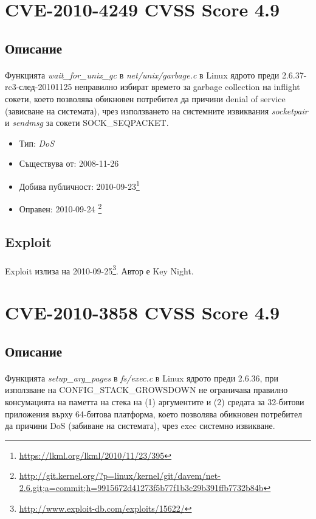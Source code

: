 \documentclass[a4paper,12pt,leqno]{article}
\begin{document}
\section{CVE-2010-4249 CVSS Score 4.9}
\subsection{Описание}
\paragraph{}
Функцията \textit{wait\_for\_unix\_gc} в \textit{net/unix/garbage.c} в Linux ядрото преди 2.6.37-rc3-след-20101125 неправилно избират времето за garbage collection на inflight сокети, което позволява обикновен потребител да причини denial of service (зависване на системата), чрез използването на системните извиквания \textit{socketpair} и \textit{sendmsg} за сокети SOCK\_SEQPACKET.

\begin{itemize}
    \item Тип: \textit{DoS}
    \item Съществува от: 2008-11-26
  	\item Добива публичност: 2010-09-23\footnote{\url{https://lkml.org/lkml/2010/11/23/395}}
    \item Оправен: 2010-09-24 \footnote{\url{http://git.kernel.org/?p=linux/kernel/git/davem/net-2.6.git;a=commit;h=9915672d41273f5b77f1b3c29b391ffb7732b84b}}
\end{itemize}

\subsection{Exploit}
\paragraph{}
Exploit излиза на 2010-09-25\footnote{\url{http://www.exploit-db.com/exploits/15622/}}. Автор е Key Night.

\section{CVE-2010-3858 CVSS Score 4.9}
\subsection{Описание}
\paragraph{}
Функцията \textit{setup\_arg\_pages} в \textit{fs/exec.c} в Linux ядрото преди 2.6.36, при използване на CONFIG\_STACK\_GROWSDOWN не ограничава правилно консумацията на паметта на стека на (1) аргументите и (2) средата за 32-битови приложения върху 64-битова платформа, което позволява обикновен потребител да причини DoS (забиване на системата), чрез exec системно извикване.
\end{document}
